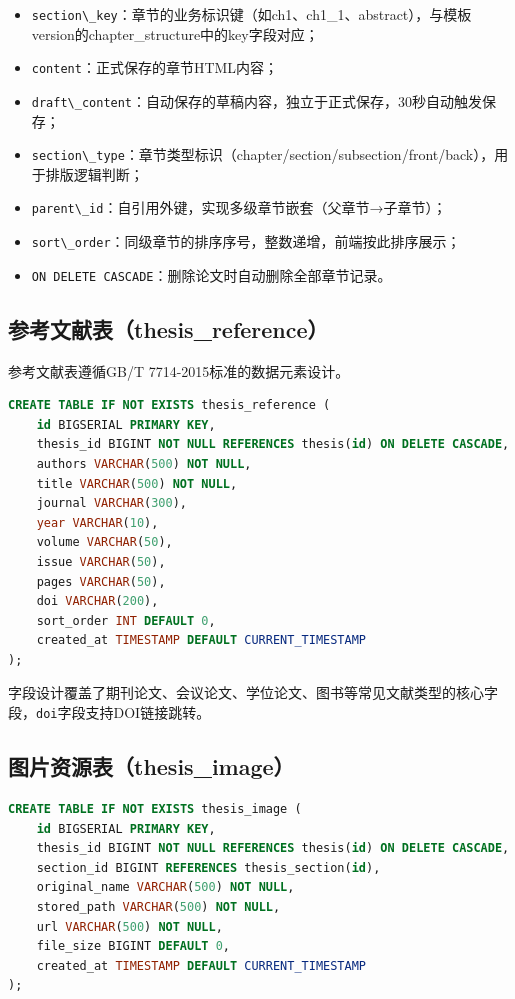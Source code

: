 \begin{itemize}
    \item \verb|section\_key|：章节的业务标识键（如ch1、ch1\_1、abstract），与模板version的chapter\_structure中的key字段对应；
    \item \verb|content|：正式保存的章节HTML内容；
    \item \verb|draft\_content|：自动保存的草稿内容，独立于正式保存，30秒自动触发保存；
    \item \verb|section\_type|：章节类型标识（chapter/section/subsection/front/back），用于排版逻辑判断；
    \item \verb|parent\_id|：自引用外键，实现多级章节嵌套（父章节→子章节）；
    \item \verb|sort\_order|：同级章节的排序序号，整数递增，前端按此排序展示；
    \item \verb|ON DELETE CASCADE|：删除论文时自动删除全部章节记录。
\end{itemize}

\subsection{参考文献表（thesis\_reference）}

参考文献表遵循GB/T 7714-2015标准的数据元素设计。

\begin{lstlisting}[language=SQL,caption={thesis\_reference 建表语句}]
CREATE TABLE IF NOT EXISTS thesis_reference (
    id BIGSERIAL PRIMARY KEY,
    thesis_id BIGINT NOT NULL REFERENCES thesis(id) ON DELETE CASCADE,
    authors VARCHAR(500) NOT NULL,
    title VARCHAR(500) NOT NULL,
    journal VARCHAR(300),
    year VARCHAR(10),
    volume VARCHAR(50),
    issue VARCHAR(50),
    pages VARCHAR(50),
    doi VARCHAR(200),
    sort_order INT DEFAULT 0,
    created_at TIMESTAMP DEFAULT CURRENT_TIMESTAMP
);
\end{lstlisting}

字段设计覆盖了期刊论文、会议论文、学位论文、图书等常见文献类型的核心字段，\verb|doi|字段支持DOI链接跳转。

\subsection{图片资源表（thesis\_image）}

\begin{lstlisting}[language=SQL,caption={thesis\_image 建表语句}]
CREATE TABLE IF NOT EXISTS thesis_image (
    id BIGSERIAL PRIMARY KEY,
    thesis_id BIGINT NOT NULL REFERENCES thesis(id) ON DELETE CASCADE,
    section_id BIGINT REFERENCES thesis_section(id),
    original_name VARCHAR(500) NOT NULL,
    stored_path VARCHAR(500) NOT NULL,
    url VARCHAR(500) NOT NULL,
    file_size BIGINT DEFAULT 0,
    created_at TIMESTAMP DEFAULT CURRENT_TIMESTAMP
);
\end{lstlisting}

